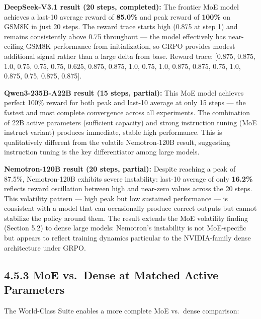 \documentclass[
  american,
  11pt,
  a4paper,
  oneside]{report}
\begin{document}
\textbf{DeepSeek-V3.1 result (20 steps, completed):} The frontier MoE
model achieves a last-10 average reward of \textbf{85.0\%} and peak
reward of \textbf{100\%} on GSM8K in just 20 steps. The reward trace
starts high (0.875 at step 1) and remains consistently above 0.75
throughout --- the model effectively has near-ceiling GSM8K performance
from initialization, so GRPO provides modest additional signal rather
than a large delta from base. Reward trace: {[}0.875, 0.875, 1.0, 0.75,
0.75, 0.75, 0.625, 0.875, 0.875, 1.0, 0.75, 1.0, 0.875, 0.875, 0.75,
1.0, 0.875, 0.75, 0.875, 0.875{]}.

\textbf{Qwen3-235B-A22B result (15 steps, partial):} This MoE model
achieves perfect 100\% reward for both peak and last-10 average at only
15 steps --- the fastest and most complete convergence across all
experiments. The combination of 22B active parameters (sufficient
capacity) and strong instruction tuning (MoE instruct variant) produces
immediate, stable high performance. This is qualitatively different from
the volatile Nemotron-120B result, suggesting instruction tuning is the
key differentiator among large models.

\textbf{Nemotron-120B result (20 steps, partial):} Despite reaching a
peak of 87.5\%, Nemotron-120B exhibits severe instability: last-10
average of only \textbf{16.2\%} reflects reward oscillation between high
and near-zero values across the 20 steps. This volatility pattern ---
high peak but low sustained performance --- is consistent with a model
that can occasionally produce correct outputs but cannot stabilize the
policy around them. The result extends the MoE volatility finding
(Section 5.2) to dense large models: Nemotron's instability is not
MoE-specific but appears to reflect training dynamics particular to the
NVIDIA-family dense architecture under GRPO.

\subsection{4.5.3 MoE vs.~Dense at Matched Active
Parameters}\label{moe-vs.-dense-at-matched-active-parameters}

The World-Class Suite enables a more complete MoE vs.~dense comparison:
\end{document}
